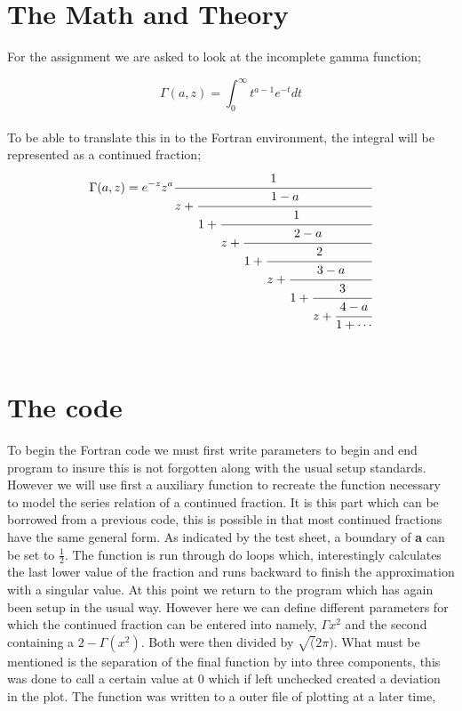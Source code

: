 \documentclass[12pt,letterpaper,notitlepage]{article}
\begin{document}
    
\section{The Math and Theory}

For the assignment we are asked to look at the incomplete gamma function;

	\begin{equation}
	\Gamma{\left(a,z\right)}=\int_{0}^{\infty}t^{a-1}e^{-t}{d}t	
	\end{equation}
\\
To be able to translate this in to the Fortran environment, the integral will be represented as a continued fraction;
\\
	\begin{equation}
\Gamma{\left(a,z\right)}=e^{-z}z^{a}\cfrac{1}{z+\cfrac{1-a}{1+\cfrac{1}{z+\cfrac{2-a}{1+\cfrac{2}{z+\cfrac{3-a}{1+\cfrac{3}{z+\cfrac{4-a}{1+\cdots}}}}}}}}
	\end{equation}	
\\
\section{The code}
To begin the Fortran code we must first write parameters to begin and end program to insure this is not forgotten along with the usual setup standards. However we will use first a auxiliary function to recreate the function necessary to model the series relation of a continued fraction. It is this part which can be borrowed from a previous code, this is possible in that most continued fractions have the same general form. As indicated by the test sheet, a boundary of \textbf{a} can be set to $\frac{1}{2}$. The function is run through do loops which, interestingly calculates the last lower value of the fraction and runs backward to finish the approximation with a singular value. 
At this point we return to the program which has again been setup in the usual way. However here we can define different parameters for which the continued fraction can be entered into namely, $\Gamma{x^2}$  and the second containing a $2-\Gamma(x^2)$. Both were then divided by $\sqrt(2\pi)$. What must be mentioned is the separation of the final function by into three components, this was done to call a certain value at 0 which if left unchecked created a deviation in the plot. The function was written to a outer file of plotting at a later time, 
\end{document}
